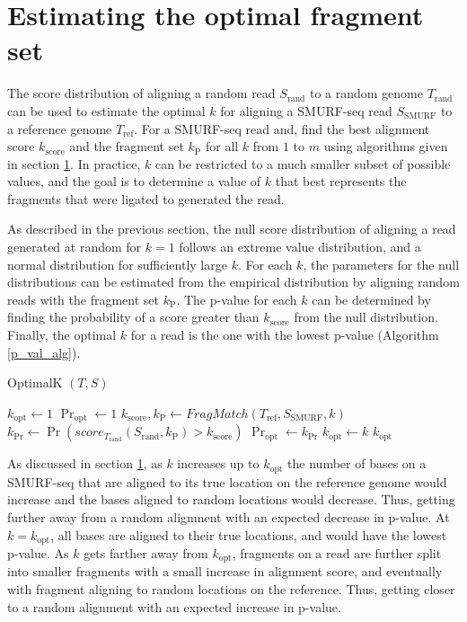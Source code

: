 \section{Estimating the optimal fragment set}
The score distribution of aligning a random read $S_\mathrm{rand}$ to a
random genome $T_\mathrm{rand}$ can be used to estimate the optimal $k$
for aligning a SMURF-seq read $S_\mathrm{SMURF}$ to a reference genome
$T_\mathrm{ref}$.
For a SMURF-seq read and, find the
best alignment score $k_\mathrm{score}$ and the fragment set
$k_\mathrm{P}$ for all $k$ from $1$ to $m$ using algorithms given
in section \ref{}. In practice, $k$ can be restricted to a much smaller
subset of possible values, and the goal is to determine a value of $k$
that best represents the fragments that were ligated to generated the
read.
%

As described in the previous section, the null score distribution of
aligning a read generated at random for $k=1$ follows an extreme value
distribution, and a normal distribution for sufficiently large $k$.  For
each $k$, the parameters for the null distributions can be estimated
from the empirical distribution by aligning random reads with the
fragment set $k_\mathrm{P}$.
%
The p-value for each $k$ can be determined by finding the probability of
a score greater than $k_\mathrm{score}$ from the null distribution.
Finally, the optimal $k$ for a read is the one with the lowest p-value
(Algorithm \ref{p_val_alg}).

\begin{algorithm}[H]
\caption{OptimalK $(T,S)$}
\begin{algorithmic}[1]
  \STATE $k_\mathrm{opt} \leftarrow 1$
  \STATE $\Pr_\mathrm{opt} \leftarrow 1$
    \STATE $k_\mathrm{score}, k_\mathrm{P} \leftarrow
              FragMatch(T_\mathrm{ref},S_\mathrm{SMURF},k)$
    \STATE $k_{\Pr} \leftarrow \Pr(score_{T_\mathrm{rand}}
              (S_\mathrm{rand},k_\mathrm{P}) > k_\mathrm{score})$
      \STATE $\Pr_\mathrm{opt} \leftarrow k_{\Pr}$
      \STATE $k_\mathrm{opt} \leftarrow k$
    \ENDIF
  \ENDFOR
  \RETURN $k_\mathrm{opt}$
\end{algorithmic}
\label{p_val_alg}
\end{algorithm}

As discussed in section \ref{}, as $k$ increases up to $k_\mathrm{opt}$
the number of bases on a SMURF-seq that are aligned to its true location
on the reference genome would increase and the bases aligned to random
locations would decrease. Thus, getting further away from a random
alignment with an expected decrease in p-value. At $k = k_\mathrm{opt}$,
all bases are aligned to their true locations, and would have the lowest
p-value. As $k$ gets farther away from $k_\mathrm{opt}$, fragments on a
read are further split into smaller fragments with a small increase in
alignment score, and eventually with fragment aligning to random
locations on the reference. Thus, getting closer to a random alignment
with an expected increase in p-value.

